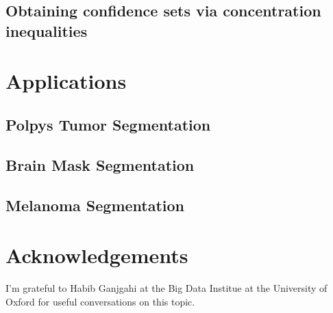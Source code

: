 \subsection{Obtaining confidence sets via concentration inequalities}

\section{Applications}

\subsection{Polpys Tumor Segmentation}

\subsection{Brain Mask Segmentation}

\subsection{Melanoma Segmentation}


\section{Acknowledgements}
I'm grateful to Habib Ganjgahi at the Big Data Institue at the University of Oxford for useful conversations on this topic. 